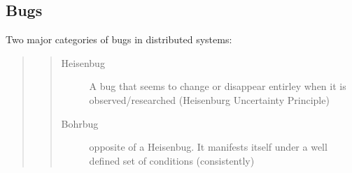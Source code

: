 \documentclass[letterpaper,10pt,english]{sphinxmanual}
\begin{document}
\subsection{Bugs}
\label{\detokenize{google_article:bugs}}
Two major categories of bugs in distributed systems:
\begin{quote}
\begin{quote}\begin{description}
\item[{Heisenbug}] \leavevmode
A bug that seems to change or disappear entirley
when it is observed/researched (Heisenburg Uncertainty Principle)

\item[{Bohrbug}] \leavevmode
opposite of a Heisenbug. It manifests itself under a well defined
set of conditions (consistently)

\end{description}\end{quote}
\end{quote}
\end{document}

